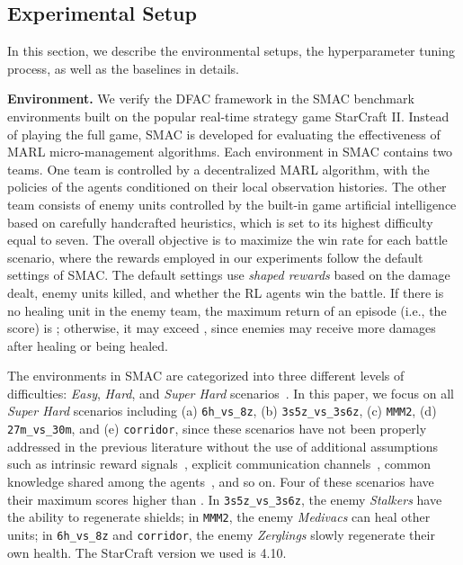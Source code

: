 \documentclass[twoside,11pt]{article}
\begin{document}
 


\subsection{Experimental Setup}
\label{subsec:experiment_results_setup_of_smac}

In this section, we describe the environmental setups, the hyperparameter tuning process, as well as the baselines in details.

\textbf{Environment.}
We verify the DFAC framework in the SMAC benchmark environments \citep{Samvelyan2019SMAC} built on the popular real-time strategy game StarCraft II. Instead of playing the full game, SMAC is developed for evaluating the effectiveness of MARL micro-management algorithms. Each environment in SMAC contains two teams. One team is controlled by a decentralized MARL algorithm, with the policies of the agents conditioned on their local observation histories. The other team consists of enemy units controlled by the built-in game artificial intelligence based on carefully handcrafted heuristics, which is set to its highest difficulty equal to seven. The overall objective is to maximize the win rate for each battle scenario, where the rewards employed in our experiments follow the default settings of SMAC. The default settings use \textit{shaped rewards} based on the damage dealt, enemy units killed, and whether the RL agents win the battle. If there is no healing unit in the enemy team, the maximum return of an episode (i.e., the score) is ; otherwise, it may exceed , since enemies may receive more damages after healing or being healed.

The environments in SMAC are categorized into three different levels of difficulties: \textit{Easy}, \textit{Hard}, and \textit{Super Hard} scenarios~\citep{Samvelyan2019SMAC}. In this paper, we focus on all \textit{Super Hard} scenarios including (a) \texttt{6h\_vs\_8z},  (b) \texttt{3s5z\_vs\_3s6z}, (c) \texttt{MMM2}, (d) \texttt{27m\_vs\_30m}, and (e) \texttt{corridor}, since these scenarios have not been properly addressed in the previous literature without the use of additional assumptions such as intrinsic reward signals~\citep{Du2019LIIR}, explicit communication channels~\citep{Zhang2019VBN,Wang2019NDQ}, common knowledge shared among the agents~\citep{De2019MACKRL,Wang2020ROMA}, and so on. Four of these scenarios have their maximum scores higher than . In \texttt{3s5z\_vs\_3s6z}, the enemy \textit{Stalkers} have the ability to regenerate shields; in \texttt{MMM2}, the enemy \textit{Medivacs} can heal other units; in \texttt{6h\_vs\_8z} and \texttt{corridor}, the enemy \textit{Zerglings} slowly regenerate their own health. The StarCraft version we used is 4.10.
\end{document}

